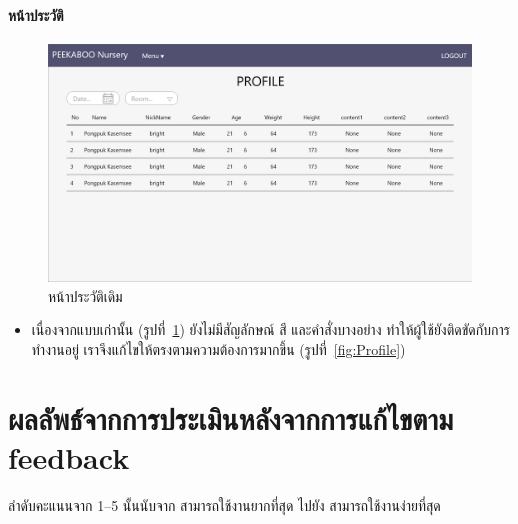 \paragraph{หน้าประวัติ}
\begin{figure}
  \begin{center}
    \includegraphics[width=\linewidth]{images/ProfileOnePage.png}
  \end{center}
  \caption{หน้าประวัติเดิม}
  \label{fig:old3}
\end{figure}
\begin{itemize}
    \item เนื่องจากแบบเก่านั้น (รูปที่~\ref{fig:old3}) ยังไม่มีสัญลักษณ์ สี และคำสั่งบางอย่าง ทำให้ผู้ใช้ยังติดขัดกับการทำงานอยู่ เราจึงแก้ไขให้ตรงตามความต้องการมากขึ้น (รูปที่~\ref{fig:Profile})
\end{itemize}



\section{ผลลัพธ์จากการประเมินหลังจากการแก้ไขตาม feedback}
ลำดับคะแนนจาก 1--5 นั้นนับจาก สามารถใช้งานยากที่สุด ไปยัง สามารถใช้งานง่ายที่สุด
